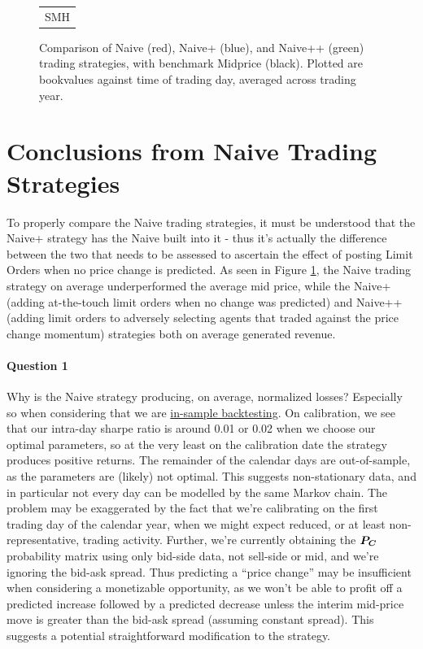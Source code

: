 \begin{figure}[h]
\begin{tabular}{cc}
    \multicolumn{2}{c}{SMH}  	
  \end{tabular}
  \caption{Comparison of Naive (red), Naive+ (blue), and Naive++ (green) trading strategies, with benchmark Midprice (black). Plotted are bookvalues against time of trading day, averaged across trading year.}
  \label{fig:comp}
\end{figure}

\section{Conclusions from Naive Trading Strategies}

To properly compare the Naive trading strategies, it must be understood that the Naive+ strategy has the Naive built into it - thus it's actually the difference between the two that needs to be assessed to ascertain the effect of posting Limit Orders when no price change is predicted. As seen in Figure \ref{fig:comp}, the Naive trading strategy on average underperformed the average mid price, while the Naive+ (adding at-the-touch limit orders when no change was predicted) and Naive++ (adding limit orders to adversely selecting agents that traded against the price change momentum) strategies both on average generated revenue. 

\paragraph{Question 1} Why is the Naive strategy producing, on average, normalized losses? Especially so when considering that we are \underline{in-sample backtesting}. On calibration, we see that our intra-day sharpe ratio is around 0.01 or 0.02 when we choose our optimal parameters, so at the very least on the calibration date the strategy produces positive returns. The remainder of the calendar days are out-of-sample, as the parameters are (likely) not optimal. This suggests non-stationary data, and in particular not every day can be modelled by the same Markov chain. The problem may be exaggerated by the fact that we're calibrating on the first trading day of the calendar year, when we might expect reduced, or at least non-representative, trading activity. Further, we're currently obtaining the $\boldsymbol{P_C}$ probability matrix using only bid-side data, not sell-side or mid, and we're ignoring the bid-ask spread. Thus predicting a ``price change'' may be insufficient when considering a monetizable opportunity, as we won't be able to profit off a predicted increase followed by a predicted decrease unless the interim mid-price move is greater than the bid-ask spread (assuming constant spread). This suggests a potential straightforward modification to the strategy.

